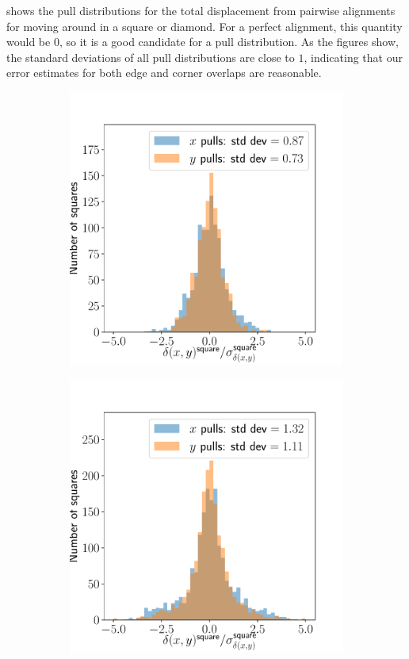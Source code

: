 \documentclass{article}
\begin{document}
 shows the pull distributions for the total displacement from pairwise alignments for moving around in a square or diamond.  For a perfect alignment, this quantity would be $0$, so it is a good candidate for a pull distribution.  As the figures show, the standard deviations of all pull distributions are close to $1$, indicating that our error estimates for both edge and corner overlaps are reasonable.

\begin{figure}[ht]
	\centering
	\begin{subfigure}{0.32\linewidth}
		\includegraphics[width=\linewidth]{squarepull1.pdf}
		\caption{}
		\label{fig:squarepull1}
	\end{subfigure}
	\begin{subfigure}{0.32\linewidth}
		\includegraphics[width=\linewidth]{squarepull2.pdf}

\end{subfigure}
\end{figure}
\end{document}
